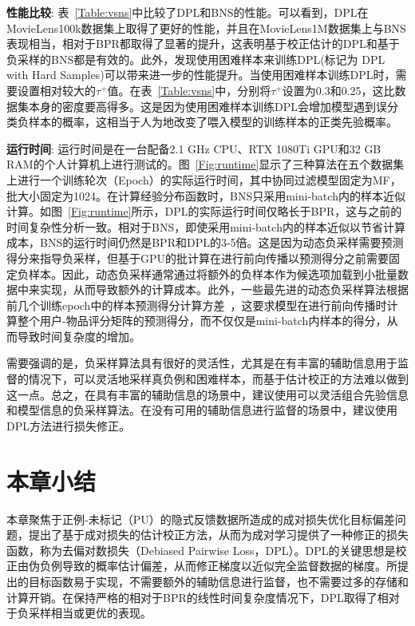 \textbf{性能比较}:
表~\ref{Table:vsns}中比较了DPL和BNS的性能。可以看到，DPL在MovieLens100k数据集上取得了更好的性能，并且在MovieLens1M数据集上与BNS表现相当，相对于BPR都取得了显著的提升，这表明基于校正估计的DPL和基于负采样的BNS都是有效的。此外，发现使用困难样本来训练DPL(标记为 DPL with Hard Samples)可以带来进一步的性能提升。当使用困难样本训练DPL时，需要设置相对较大的$\tau^+$值。在表~\ref{Table:vsns}中，分别将$\tau^+$设置为0.3和0.25，这比数据集本身的密度要高得多。这是因为使用困难样本训练DPL会增加模型遇到误分类负样本的概率，这相当于人为地改变了喂入模型的训练样本的正类先验概率。

\textbf{运行时间}: 运行时间是在一台配备2.1 GHz CPU、RTX 1080Ti GPU和32 GB RAM的个人计算机上进行测试的。图~\ref{Fig:runtime}显示了三种算法在五个数据集上进行一个训练轮次（Epoch）的实际运行时间，其中协同过滤模型固定为MF，批大小固定为1024。在计算经验分布函数时，BNS只采用mini-batch内的样本近似计算。如图~\ref{Fig:runtime}所示，DPL的实际运行时间仅略长于BPR，这与之前的时间复杂性分析一致。相对于BNS，即使采用mini-batch内的样本近似以节省计算成本，BNS的运行时间仍然是BPR和DPL的3-5倍。这是因为动态负采样需要预测得分来指导负采样，但基于GPU的批计算在进行前向传播以预测得分之前需要固定负样本。因此，动态负采样通常通过将额外的负样本作为候选项加载到小批量数据中来实现，从而导致额外的计算成本。此外，一些最先进的动态负采样算法根据前几个训练epoch中的样本预测得分计算方差~\cite{Ding:2019:NeurIPS}，这要求模型在进行前向传播时计算整个用户-物品评分矩阵的预测得分，而不仅仅是mini-batch内样本的得分，从而导致时间复杂度的增加。

需要强调的是，负采样算法具有很好的灵活性，尤其是在有丰富的辅助信息用于监督的情况下，可以灵活地采样真负例和困难样本，而基于估计校正的方法难以做到这一点。总之，在具有丰富的辅助信息的场景中，建议使用可以灵活组合先验信息和模型信息的负采样算法。在没有可用的辅助信息进行监督的场景中，建议使用DPL方法进行损失修正。

\section{本章小结}
本章聚焦于正例-未标记（PU）的隐式反馈数据所造成的成对损失优化目标偏差问题，提出了基于成对损失的估计校正方法，从而为成对学习提供了一种修正的损失函数，称为去偏对数损失（Debiased Pairwise Loss，DPL）。DPL的关键思想是校正由伪负例导致的概率估计偏差，从而修正梯度以近似完全监督数据的梯度。所提出的目标函数易于实现，不需要额外的辅助信息进行监督，也不需要过多的存储和计算开销。在保持严格的相对于BPR的线性时间复杂度情况下，DPL取得了相对于负采样相当或更优的表现。

